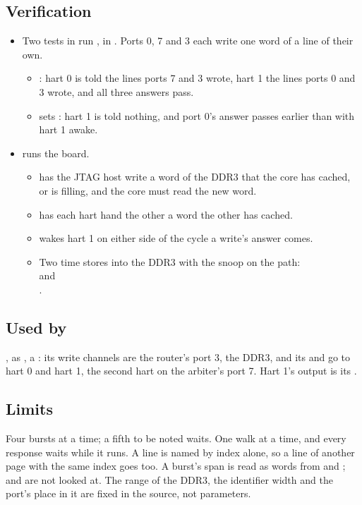 \subsection*{Verification}

\begin{itemize}
\item Two tests in  run , in
. Ports 0, 7 and 3 each write one word
of a line of their own.
\begin{itemize}
\item {}: hart 0 is
told the lines ports 7 and 3 wrote, hart 1 the lines ports 0 and 3
wrote, and all three answers pass.
\item {} sets :
hart 1 is told nothing, and port 0's answer passes earlier than with
hart 1 awake.
\end{itemize}
\item {} runs the board.
\begin{itemize}
\item {} has the JTAG
host write a word of the DDR3 that the core has cached, or is filling,
and the core must read the new word.
\item {} has each hart hand the other a
word the other has cached.
\item {} wakes hart 1
on either side of the cycle a write's answer comes.
\item Two time stores into the DDR3 with the snoop on the path:\\
 and\\
.
\end{itemize}
\end{itemize}

\subsection*{Used by}

, as , a : its write
channels are the router's port 3, the DDR3, and its  and
 go to hart 0 and hart 1, the second hart on the arbiter's
port 7. Hart 1's  output is its .

\subsection*{Limits}

Four bursts at a time; a fifth to be noted waits. One walk at a time,
and every response waits while it runs. A line is named by index alone,
so a line of another page with the same index goes too. A burst's span
is read as words from  and ;  and
 are not looked at. The range of the DDR3, the identifier
width and the port's place in it are fixed in the source, not
parameters.
